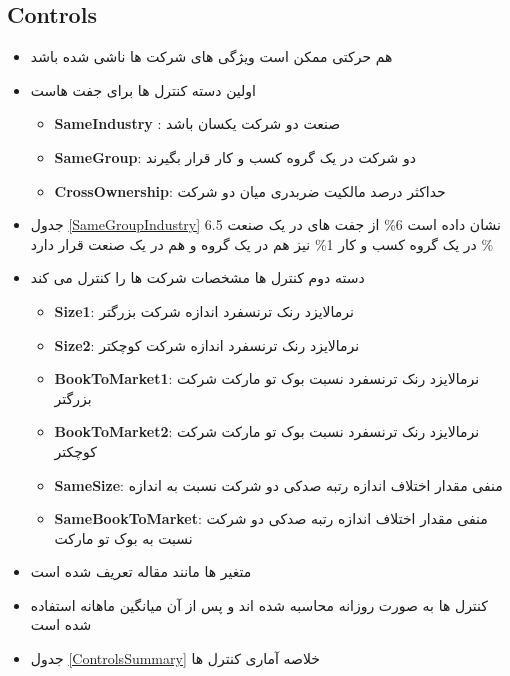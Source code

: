 \documentclass[12pt, a4paper]{article}
\begin{document}
\FloatBarrier


\subsection{Controls}

\begin{itemize}
	\item 
	هم حرکتی ممکن است ویژگی های شرکت ها ناشی شده باشد
	
	\item 
	اولین دسته کنترل ها برای جفت هاست
	\begin{itemize}
\item 
\textbf{SameIndustry} :
صنعت دو شرکت یکسان باشد
\item 
\textbf{SameGroup}:
دو شرکت در یک گروه کسب و کار قرار بگیرند
\item 
\textbf{CrossOwnership}:
حداکثر درصد مالکیت ضربدری میان دو شرکت
		
	\end{itemize}
	\item 
	جدول
	\ref{SameGroupIndustry}
	نشان داده است 6\% از جفت های در یک صنعت
	6.5 \% در یک گروه کسب و کار
	1\% نیز هم در یک گروه و هم در یک صنعت قرار دارد
	\item 
دسته دوم کنترل ها مشخصات شرکت ها را کنترل می کند
\begin{itemize}
	\item \textbf{Size1}:
	نرمالایزد رنک ترنسفرد اندازه شرکت بزرگتر
	
	
	\item \textbf{Size2}:
	نرمالایزد رنک ترنسفرد اندازه شرکت کوچکتر
	
	\item \textbf{BookToMarket1}:
	نرمالایزد رنک ترنسفرد نسبت بوک تو مارکت شرکت بزرگتر
	
	\item \textbf{BookToMarket2}:
		نرمالایزد رنک ترنسفرد نسبت بوک تو مارکت شرکت کوچکتر
	\item \textbf{SameSize}:
	منفی مقدار اختلاف اندازه رتبه صدکی دو شرکت نسبت به اندازه
	\item  \textbf{SameBookToMarket}:
	منفی مقدار اختلاف اندازه رتبه صدکی دو شرکت نسبت به بوک تو مارکت
\end{itemize}
	\item 
	متغیر ها مانند مقاله
	تعریف شده است
	\item
کنترل ها به صورت روزانه محاسبه شده اند و پس از آن میانگین ماهانه استفاده شده است
\item 
جدول 
\ref{ControlsSummary}
خلاصه آماری کنترل ها
\end{itemize}
\end{document}
